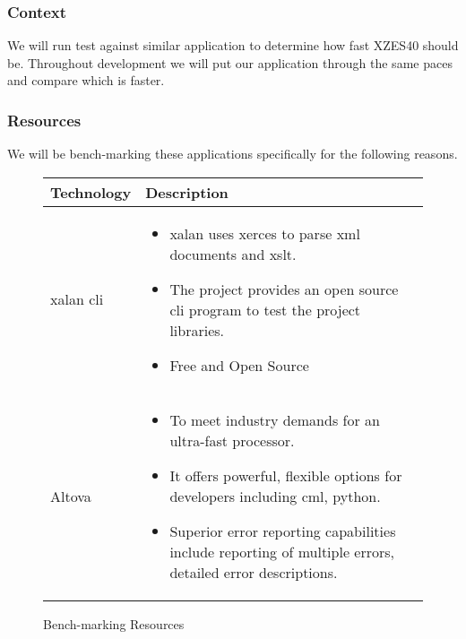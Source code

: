 \begin{enmerate}
\begin{itemzie}
\subsubsection{Context}

We will run test against similar application to determine how fast XZES40 should be.
Throughout development we will put our application through the same paces and compare which is faster.

\subsubsection{Resources}

We will be bench-marking these applications specifically for the following reasons.

\begin{figure}
  \centering
  \begin{tabular}{ | l | p{10cm} |}
    \hline
    Technology & Description  \\ \hline
    \gls{xalan} \gls{cli}&
    \begin{itemize}
      \item \gls{xalan} uses \gls{xerces} to parse \gls{xml} documents and \gls{xslt}.
      \item The project provides an open source \gls{cli} program to test the project libraries.
      \item Free and Open Source
    \end{itemize}\\ \hline
    Altova &
    \begin{itemize}
      \item To meet industry demands for an ultra-fast processor.
      \item It offers powerful, flexible options for developers including cml, python.
      \item Superior error reporting capabilities include reporting of multiple errors, detailed error descriptions.
    \end{itemize} \\ \hline
  \end{tabular}
  \caption{Bench-marking Resources}
\end{figure}



\end{itemzie}
\end{enmerate}
